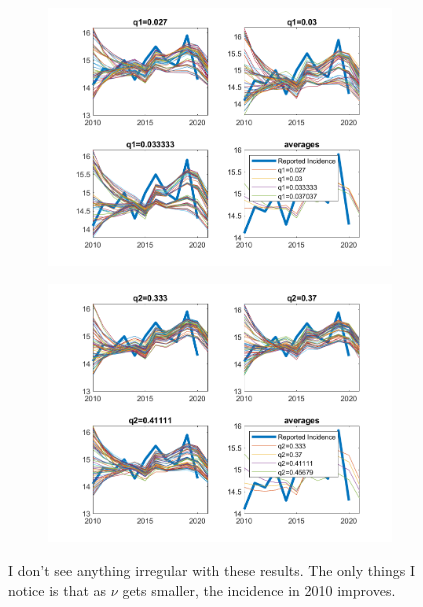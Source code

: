 \documentclass{article}
\begin{document}
\begin{figure}
	\begin{subfigure}[b]{0.475\textwidth}
		\centering
		\includegraphics[width=\textwidth]{Sensitivty_q1Run5.png}  
	\end{subfigure} 
	\hfill
	\begin{subfigure}[b]{0.475\textwidth}
		\centering
		\includegraphics[width=\textwidth]{Sensitivty_q2Run5.png}  
	\end{subfigure} 
	
	\caption{I don't see anything irregular with these results.  The only things I notice is that as $\nu$ gets smaller, the incidence in 2010 improves.}
	\label{fig:SensitivtyAverages5}
\end{figure}
\end{document}
